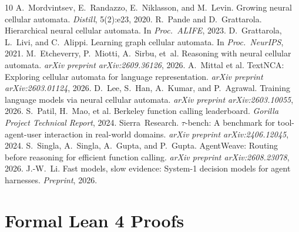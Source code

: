 \documentclass[10pt,twocolumn,letterpaper]{article}
\begin{document}
\newpage
\begin{thebibliography}{10}
\small
\setlength{\itemsep}{1.5pt plus 0.5pt minus 0.5pt}
\setlength{\parskip}{0pt}
A.~Mordvintsev, E.~Randazzo, E.~Niklasson, and M.~Levin.
\newblock Growing neural cellular automata.
\newblock \emph{Distill}, 5(2):e23, 2020.
R.~Pande and D.~Grattarola.
\newblock Hierarchical neural cellular automata.
\newblock In \emph{Proc.\ ALIFE}, 2023.
D.~Grattarola, L.~Livi, and C.~Alippi.
\newblock Learning graph cellular automata.
\newblock In \emph{Proc.\ NeurIPS}, 2021.
M.~Etcheverry, P.~Miotti, A.~Sirbu, et~al.
\newblock Reasoning with neural cellular automata.
\newblock \emph{arXiv preprint arXiv:2609.36126}, 2026.
A.~Mittal et al.
\newblock TextNCA: Exploring cellular automata for language representation.
\newblock \emph{arXiv preprint arXiv:2603.01124}, 2026.
D.~Lee, S.~Han, A.~Kumar, and P.~Agrawal.
\newblock Training language models via neural cellular automata.
\newblock \emph{arXiv preprint arXiv:2603.10055}, 2026.
S.~Patil, H.~Mao, et al.
\newblock Berkeley function calling leaderboard.
\newblock \emph{Gorilla Project Technical Report}, 2024.
Sierra~Research.
\newblock $\tau$-bench: A benchmark for tool-agent-user interaction in real-world domains.
\newblock \emph{arXiv preprint arXiv:2406.12045}, 2024.
S.~Singla, A.~Singla, A.~Gupta, and P.~Gupta.
\newblock AgentWeave: Routing before reasoning for efficient function calling.
\newblock \emph{arXiv preprint arXiv:2608.23078}, 2026.
J.-W.~Li.
\newblock Fast models, slow evidence: System-1 decision models for agent harnesses.
\newblock \emph{Preprint}, 2026.
\end{thebibliography}

\clearpage
\appendix
{}
\label{sec:supplementary}

\section{Formal Lean 4 Proofs}
\label{sec:appendix-lean}
\end{document}
